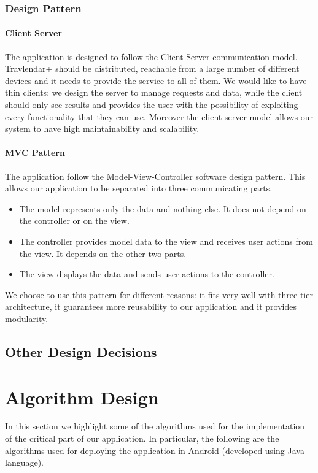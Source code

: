 \documentclass[12pt,titlepage]{article}
\begin{document}
\subsubsection{Design Pattern}
\paragraph{Client Server}
The application is designed to follow the Client-Server communication model. Travlendar+ should be distributed, reachable from a large number of different devices and it needs to provide the service to all of them.
We would like to have thin clients: we design the server to manage requests and data, while the client should only see results and provides the user with the possibility of exploiting every functionality that they can use.
Moreover the client-server model allows our system to have high maintainability and scalability.


\paragraph{MVC Pattern} The application follow the Model-View-Controller software design pattern. This allows our application to be separated into three communicating parts.
\begin{itemize}
\item The model represents only the data and nothing else. It does not depend on the controller or on the view.
\item The controller provides model data to the view and receives user actions from the view. It depends on the other two parts.
\item The view displays the data and sends user actions to the controller.
\end{itemize}
We choose to use this pattern for different reasons: it fits very well with three-tier architecture, it guarantees more reusability to our application and it provides modularity.

\subsection{Other Design Decisions}

\section{Algorithm Design}
In this section we highlight some of the algorithms used for the implementation of the critical part of our application. In particular, the following are the algorithms used for deploying the application in Android (developed using Java language).
\end{document}
